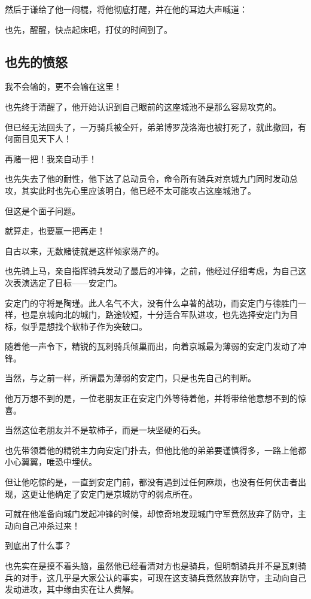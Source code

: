\begin{multicols}{\theparacolNo}
然后于谦给了他一闷棍，将他彻底打醒，并在他的耳边大声喊道：

也先，醒醒，快点起床吧，打仗的时间到了。

\subsection{也先的愤怒}
我不会输的，更不会输在这里！

也先终于清醒了，他开始认识到自己眼前的这座城池不是那么容易攻克的。

但已经无法回头了，一万骑兵被全歼，弟弟博罗茂洛海也被打死了，就此撤回，有何面目见天下人！

再赌一把！我亲自动手！

也先失去了他的耐性，他下达了总动员令，命令所有骑兵对京城九门同时发动总攻，其实此时也先心里应该明白，他已经不太可能攻占这座城池了。

但这是个面子问题。

就算走，也要赢一把再走！

自古以来，无数赌徒就是这样倾家荡产的。

也先骑上马，亲自指挥骑兵发动了最后的冲锋，之前，他经过仔细考虑，为自己这次表演选定了目标——安定门。

安定门的守将是陶瑾。此人名气不大，没有什么卓著的战功，而安定门与德胜门一样，也是京城向北的城门，路途较短，十分适合军队进攻，也先选择安定门为目标，似乎是想找个软柿子作为突破口。

随着他一声令下，精锐的瓦剌骑兵倾巢而出，向着京城最为薄弱的安定门发动了冲锋。

当然，与之前一样，所谓最为薄弱的安定门，只是也先自己的判断。

他万万想不到的是，一位老朋友正在安定门外等待着他，并将带给他意想不到的惊喜。

当然这位老朋友并不是软柿子，而是一块坚硬的石头。

也先带领着他的精锐主力向安定门扑去，但他比他的弟弟要谨慎得多，一路上他都小心翼翼，唯恐中埋伏。

但让他吃惊的是，一直到安定门前，都没有遇到过任何麻烦，也没有任何伏击者出现，这更让他确定了安定门是京城防守的弱点所在。

可就在他准备向城门发起冲锋的时候，却惊奇地发现城门守军竟然放弃了防守，主动向自己冲杀过来！

到底出了什么事？

也先实在是摸不着头脑，虽然他已经看清对方也是骑兵，但明朝骑兵并不是瓦剌骑兵的对手，这几乎是大家公认的事实，可现在这支骑兵竟然放弃防守，主动向自己发动进攻，其中缘由实在让人费解。


\end{multicols}
